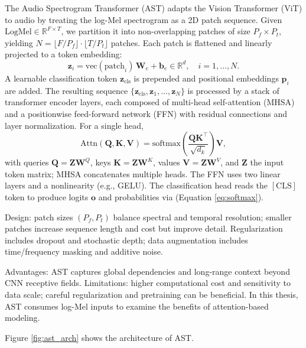 The Audio Spectrogram Transformer (AST) adapts the Vision Transformer (ViT) to audio by treating the log-Mel spectrogram as a 2D patch sequence. Given \(\mathrm{LogMel} \in \mathbb{R}^{F\times T}\), we partition it into non-overlapping patches of size \(P_f\!\times\!P_t\), yielding \(N = \lfloor F/P_f \rfloor \cdot \lfloor T/P_t \rfloor\) patches. Each patch is flattened and linearly projected to a token embedding:
\begin{equation}\label{eq:patchify}
\mathbf{z}_i = \mathrm{vec}(\mathrm{patch}_i)\, \mathbf{W}_e + \mathbf{b}_e \in \mathbb{R}^{d}, \quad i=1,\dots,N.
\end{equation}
A learnable classification token \(\mathbf{z}_{\mathrm{cls}}\) is prepended and positional embeddings \(\mathbf{p}_i\) are added. The resulting sequence \(\{\mathbf{z}_{\mathrm{cls}}, \mathbf{z}_1,\dots,\mathbf{z}_N\}\) is processed by a stack of transformer encoder layers, each composed of multi-head self-attention (MHSA) and a positionwise feed-forward network (FFN) with residual connections and layer normalization. For a single head,
\begin{equation}\label{eq:attn}
\mathrm{Attn}(\mathbf{Q},\mathbf{K},\mathbf{V}) = \mathrm{softmax}\!\left( \frac{\mathbf{Q}\mathbf{K}^\top}{\sqrt{d_k}} \right) \mathbf{V},
\end{equation}
with queries \(\mathbf{Q}=\mathbf{Z}\mathbf{W}^Q\), keys \(\mathbf{K}=\mathbf{Z}\mathbf{W}^K\), values \(\mathbf{V}=\mathbf{Z}\mathbf{W}^V\), and \(\mathbf{Z}\) the input token matrix; MHSA concatenates multiple heads. The FFN uses two linear layers and a nonlinearity (e.g., GELU). The classification head reads the \([\mathrm{CLS}]\) token to produce logits \(\mathbf{o}\) and probabilities via (Equation \ref{eq:softmax}).

Design: patch sizes \((P_f,P_t)\) balance spectral and temporal resolution; smaller patches increase sequence length and cost but improve detail. Regularization includes dropout and stochastic depth; data augmentation includes time/frequency masking and additive noise.

Advantages: AST captures global dependencies and long-range context beyond CNN receptive fields. Limitations: higher computational cost and sensitivity to data scale; careful regularization and pretraining can be beneficial. In this thesis, AST consumes log-Mel inputs to examine the benefits of attention-based modeling.

Figure \ref{fig:ast_arch} shows the architecture of AST.

